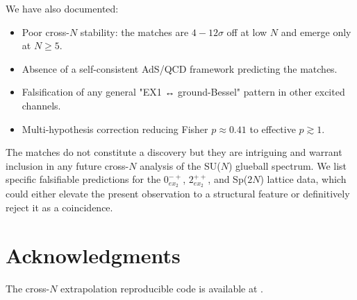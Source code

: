 \documentclass[reprint,prd,amsmath,amssymb,nofootinbib,superscriptaddress]{revtex4-2}
\begin{document}
We have also documented:
\begin{itemize}
  \item Poor cross-$N$ stability: the matches are $4-12\sigma$ off at low $N$ and emerge only at $N \geq 5$.
  \item Absence of a self-consistent AdS/QCD framework predicting the matches.
  \item Falsification of any general "EX1 ↔ ground-Bessel" pattern in other excited channels.
  \item Multi-hypothesis correction reducing Fisher $p \approx 0.41$ to effective $p \gtrsim 1$.
\end{itemize}

The matches do not constitute a discovery but they are intriguing and warrant inclusion in any future cross-$N$ analysis of the SU($N$) glueball spectrum. We list specific falsifiable predictions for the $0^{-+}_{ex_2}$, $2^{++}_{ex_2}$, and Sp($2N$) lattice data, which could either elevate the present observation to a structural feature or definitively reject it as a coincidence.

\section*{Acknowledgments}

The cross-$N$ extrapolation reproducible code is available at \cite{Code2026}.
\end{document}
